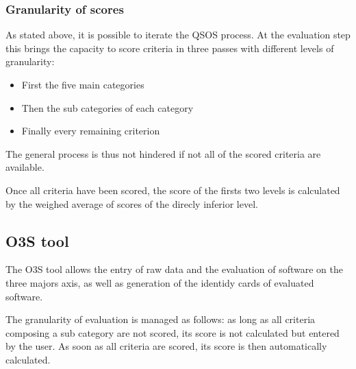 \subsubsection{Granularity of scores}
As stated above, it is possible to iterate the QSOS process. 
At the evaluation step this brings the capacity to score criteria in 
three passes with different levels of granularity:

\begin{itemize}
\item First the five main categories
\item Then the sub categories of each category
\item Finally every remaining criterion
\end{itemize}


The general process is thus not hindered if not all of the scored criteria are available.


Once all criteria have been scored, the score of the firsts two levels is calculated by the weighed average of scores of the direcly inferior level.

\subsection{O3S tool}
The O3S tool allows the entry of raw data and the evaluation of software on the three majors axis, 
as well as generation of the identidy cards of evaluated software.


The granularity of evaluation is managed as follows: as long as all
criteria composing a sub category are not scored, its score is not 
calculated but entered by the user. As soon as all criteria are scored, 
its score is then automatically calculated.
